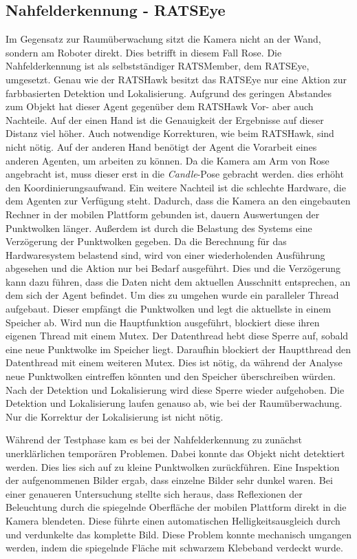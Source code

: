 \subsection{Nahfelderkennung - RATSEye}
\label{sec:eye}
Im Gegensatz zur Raumüberwachung sitzt die Kamera nicht an der Wand, sondern am Roboter direkt. Dies betrifft in diesem Fall Rose. Die Nahfelderkennung ist als selbstständiger RATSMember, dem RATSEye, umgesetzt. Genau wie der RATSHawk besitzt das RATSEye nur eine Aktion zur farbbasierten Detektion und Lokalisierung. Aufgrund des geringen Abstandes zum Objekt hat dieser Agent gegenüber dem RATSHawk Vor- aber auch Nachteile. Auf der einen Hand ist die Genauigkeit der Ergebnisse auf dieser Distanz viel höher. Auch notwendige Korrekturen, wie beim RATSHawk, sind nicht nötig. Auf der anderen Hand benötigt der Agent die Vorarbeit eines anderen Agenten, um arbeiten zu können. Da die Kamera am Arm von Rose angebracht ist, muss dieser erst in die \textit{Candle}-Pose gebracht werden. dies erhöht den Koordinierungsaufwand. Ein weitere Nachteil ist die schlechte Hardware, die dem Agenten zur Verfügung steht. Dadurch, dass die Kamera an den eingebauten Rechner in der mobilen Plattform gebunden ist, dauern Auswertungen der Punktwolken länger. Außerdem ist durch die Belastung des Systems eine Verzögerung der Punktwolken gegeben. Da die Berechnung für das Hardwaresystem belastend sind, wird von einer wiederholenden Ausführung abgesehen und die Aktion nur bei Bedarf ausgeführt. Dies und die Verzögerung kann dazu führen, dass die Daten nicht dem aktuellen Ausschnitt entsprechen, an dem sich der Agent befindet. Um dies zu umgehen wurde ein paralleler Thread aufgebaut. Dieser empfängt die Punktwolken und legt die aktuellste in einem Speicher ab. Wird nun die Hauptfunktion ausgeführt, blockiert diese ihren eigenen Thread mit einem Mutex. Der Datenthread hebt diese Sperre auf, sobald eine neue Punktwolke im Speicher liegt. Daraufhin blockiert der Hauptthread den Datenthread mit einem weiteren Mutex. Dies ist nötig, da während der Analyse neue Punktwolken eintreffen könnten und den Speicher überschreiben würden. Nach der Detektion und Lokalisierung wird diese Sperre wieder aufgehoben. Die Detektion und Lokalisierung laufen genauso ab, wie bei der Raumüberwachung. Nur die Korrektur der Lokalisierung ist nicht nötig.

Während der Testphase kam es bei der Nahfelderkennung zu zunächst unerklärlichen temporären Problemen. Dabei konnte das Objekt nicht detektiert werden. Dies lies sich auf zu kleine Punktwolken zurückführen. Eine Inspektion der aufgenommenen Bilder ergab, dass einzelne Bilder sehr dunkel waren. Bei einer genaueren Untersuchung stellte sich heraus, dass Reflexionen der Beleuchtung durch die spiegelnde Oberfläche der mobilen Plattform direkt in die Kamera blendeten. Diese führte einen automatischen Helligkeitsausgleich durch und verdunkelte das komplette Bild. Diese Problem konnte mechanisch umgangen werden, indem die spiegelnde Fläche mit schwarzem Klebeband verdeckt wurde.


